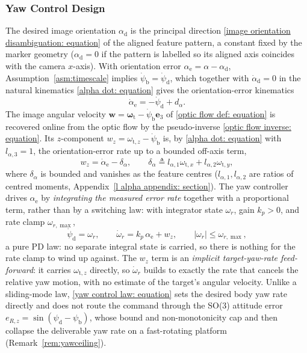 \documentclass{IEEEtaes}
\theoremstyle{definition}
\theoremstyle{remark}
\begin{document}
\subsubsection{Yaw Control Design} \label{yaw control: section}
The desired image orientation $\alpha_\text{d}$ is the principal direction \eqref{image orientation disambiguation: equation} of the aligned feature pattern, a constant fixed by the marker geometry ($\alpha_\text{d}=0$ if the pattern is labelled so its aligned axis coincides with the camera $x$-axis). With orientation error $\alpha_\text{e}=\alpha-\alpha_\text{d}$, Assumption~\ref{asm:timescale} implies $\dot{\psi}_\text{b}=\dot{\psi}_\text{d}$, which together with $\dot{\alpha}_\text{d}=0$ in the natural kinematics \eqref{alpha dot: equation} gives the orientation-error kinematics
\begin{equation} \label{alpha_e_dot: equation}
    \dot{\alpha}_\text{e} = -\dot{\psi}_\text{d} + d_{\alpha}.
\end{equation}
The image angular velocity $\boldsymbol{w}=\boldsymbol{\omega}_\text{t}-\dot{\psi}_\text{b}\hat{\boldsymbol{e}}_3$ of \eqref{optic flow def: equation} is recovered online from the optic flow by the pseudo-inverse \eqref{optic flow inverse: equation}. Its $z$-component $w_z=\omega_{\text{t},z}-\dot{\psi}_\text{b}$ is, by \eqref{alpha dot: equation} with $l_{\alpha,3}=1$, the orientation-error rate up to a bounded off-axis term,
\begin{equation} \label{wz identity: equation}
    w_z = \dot{\alpha}_\text{e} - \delta_{\alpha},\qquad \delta_{\alpha}\triangleq l_{\alpha,1}\omega_{\text{t},x}+l_{\alpha,2}\omega_{\text{t},y},
\end{equation}
where $\delta_{\alpha}$ is bounded and vanishes as the feature centres ($l_{\alpha,1},l_{\alpha,2}$ are ratios of centred moments, Appendix~\ref{l alpha appendix: section}). The yaw controller drives $\alpha_\text{e}$ by \emph{integrating the measured error rate} together with a proportional term, rather than by a switching law: with integrator state $\omega_r$, gain $k_p>0$, and rate clamp $\omega_{r,\max}$,
\begin{equation} \label{yaw control law: equation}
    \dot{\psi}_\text{d} = \omega_r,\qquad
    \dot{\omega}_r = k_p\,\alpha_\text{e} + w_z,\qquad
    |\omega_r|\le\omega_{r,\max},
\end{equation}
a pure PD law: no separate integral state is carried, so there is nothing for the rate clamp to wind up against. The $w_z$ term is an \emph{implicit target-yaw-rate feed-forward}: it carries $\omega_{\text{t},z}$ directly, so $\dot{\omega}_r$ builds to exactly the rate that cancels the relative yaw motion, with no estimate of the target's angular velocity. Unlike a sliding-mode law, \eqref{yaw control law: equation} sets the desired body yaw rate directly and does not route the command through the SO(3) attitude error $e_{R,z}=\sin(\psi_\text{d}-\psi_\text{b})$, whose bound and non-monotonicity cap and then collapse the deliverable yaw rate on a fast-rotating platform (Remark~\ref{rem:yawceiling}).
\end{document}
